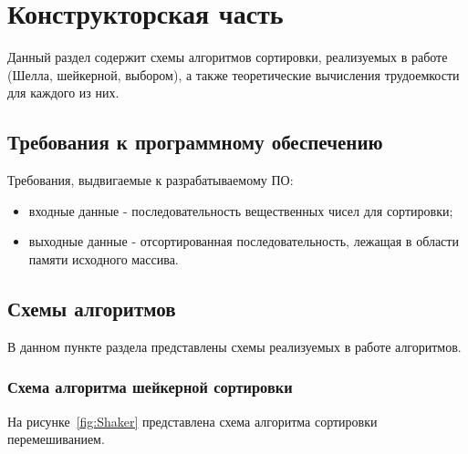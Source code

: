 \documentclass[12pt]{report}
\begin{document}
    \newpage


    \chapter{Конструкторская часть}
    Данный раздел содержит схемы алгоритмов сортировки, реализуемых в работе (Шелла, шейкерной, выбором),
    а также теоретические вычисления трудоемкости для каждого из них.


    \section{Требования к программному обеспечению}
    Требования, выдвигаемые к разрабатываемому ПО:
    \begin{itemize}
        \item входные данные - последовательность вещественных чисел для сортировки;
        \item выходные данные - отсортированная последовательность, лежащая в области памяти исходного массива.
    \end{itemize}


    \section{Схемы алгоритмов}
    В данном пункте раздела представлены схемы реализуемых в работе алгоритмов.

    \subsection{Схема алгоритма шейкерной сортировки}
    На рисунке~\ref{fig:Shaker} представлена схема алгоритма сортировки перемешиванием.
\end{document}
